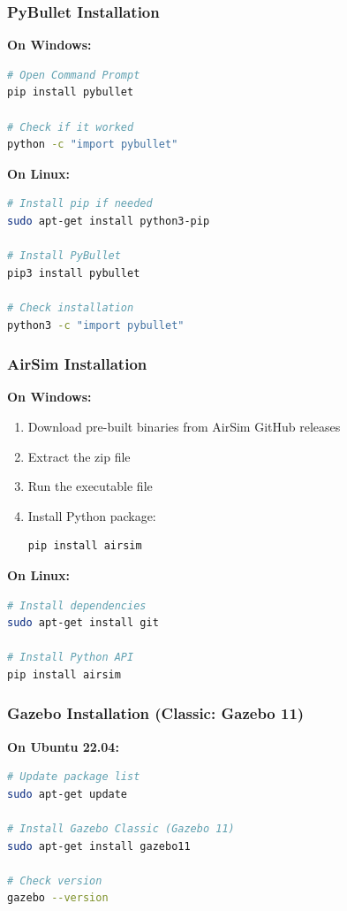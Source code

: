 \subsubsection{PyBullet Installation}

\textbf{On Windows:}
\begin{lstlisting}[language=bash]
# Open Command Prompt
pip install pybullet

# Check if it worked
python -c "import pybullet"
\end{lstlisting}

\textbf{On Linux:}
\begin{lstlisting}[language=bash]
# Install pip if needed
sudo apt-get install python3-pip

# Install PyBullet
pip3 install pybullet

# Check installation
python3 -c "import pybullet"
\end{lstlisting}

\subsubsection{AirSim Installation}

\textbf{On Windows:}
\begin{enumerate}
	\item Download pre-built binaries from AirSim GitHub releases
	\item Extract the zip file
	\item Run the executable file
	\item Install Python package:
\begin{lstlisting}[language=bash]
pip install airsim
\end{lstlisting}
\end{enumerate}

\textbf{On Linux:}
\begin{lstlisting}[language=bash]
# Install dependencies
sudo apt-get install git

# Install Python API
pip install airsim
\end{lstlisting}

\subsubsection{Gazebo Installation (Classic: Gazebo 11)}

\textbf{On Ubuntu 22.04:}
\begin{lstlisting}[language=bash]
# Update package list
sudo apt-get update

# Install Gazebo Classic (Gazebo 11)
sudo apt-get install gazebo11

# Check version
gazebo --version
\end{lstlisting}

